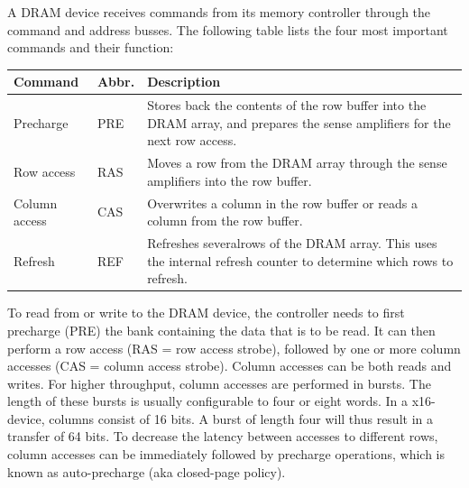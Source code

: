 A DRAM device receives commands from its memory controller through the command and  address busses.
The following table lists the four most important commands and their function:
\begin{center}
\begin{tabular}{p{13mm}p{6mm}p{5.5cm}}
Command 				& Abbr. & Description\\\hline
Precharge    			& PRE   & Stores back the contents of the row buffer into the DRAM array, and prepares the sense amplifiers for the next row access.\\
Row\hspace{13mm} access & RAS	& Moves a row from the DRAM array through the sense amplifiers into the row buffer.\\
Column access 			& CAS   & Overwrites a column in the row buffer or reads a column from the row buffer.\\
Refresh					& REF	& Refreshes several\footnotemark rows of the DRAM array. This uses the internal refresh counter to determine which rows to refresh.\\
\end{tabular}
\end{center}

To read from or write to the DRAM device, the controller needs to first precharge (PRE) the bank containing the data that is to be read.
It can then perform a row access (RAS = row access strobe), followed by one or more column accesses (CAS = column access strobe).
Column accesses can be both reads and writes.
For higher throughput, column accesses are performed in bursts.
The length of these bursts is usually configurable to four or eight words.
In a x16-device, columns consist of 16 bits. 
A burst of length four will thus result in a transfer of 64 bits.
To decrease the latency between accesses to different rows, column accesses can be immediately followed by precharge operations, which is known as auto-precharge (aka closed-page policy).

